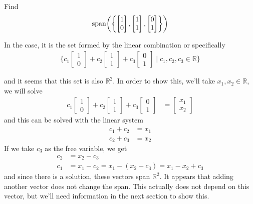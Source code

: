 \begin{example} \label{ex:span:3}
Find
%
\begin{align*}
\operatorname{span}\biggl( \biggl\{ \begin{bmatrix}
1 \\ 0
\end{bmatrix}, \begin{bmatrix}
1 \\ 1
\end{bmatrix}, \begin{bmatrix}
0 \\1
\end{bmatrix} \biggr\} \biggr)
\end{align*}

\solution

In the case, it is the set formed by the linear combination or specifically
%
\begin{align*}
\{ c_1 \begin{bmatrix}
1 \\ 0
\end{bmatrix} + c_2 \begin{bmatrix}
1 \\ 1
\end{bmatrix}  + c_3 \begin{bmatrix}
0 \\ 1
\end{bmatrix} \; | \; c_1, c_2, c_3 \in \mathbb{R} \}
\end{align*}

and it seems that this set is also $\mathbb{R}^2$.  In order to show this, we'll take $x_1, x_2 \in \mathbb{R}$, we will solve
%
\begin{align*}
c_1 \begin{bmatrix}
1 \\ 0
\end{bmatrix} + c_2 \begin{bmatrix}
1 \\ 1
\end{bmatrix}  + c_3 \begin{bmatrix}
0 \\ 1
\end{bmatrix} & = \begin{bmatrix}
x_1 \\ x_2
\end{bmatrix}
\end{align*}
and this can be solved with the linear system
%
\begin{align*}
c_1 + c_2 & = x_1 \\
c_2 + c_3 & = x_2
\end{align*}
If we take $c_3$ as the free variable, we get
%
\begin{align*}
c_2 & = x_2 - c_3 \\
c_1 & = x_1 -c_2 = x_1 - (x_2-c_3) = x_1 - x_2 + c_3
\end{align*}
and since there is a solution, these vectors span $\mathbb{R}^2$.    It appears that adding another vector does not change the span.  This actually does not depend on this vector, but we'll need information in the next section to show this.

\end{example}

